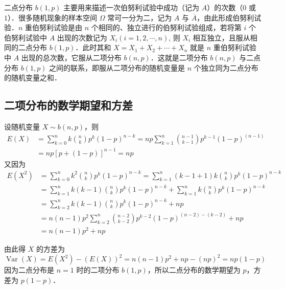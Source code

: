 二点分布 $b(1 ,p) $ 主要用来描述一次伯努利试验中成功（记为 $A$）的次数（$0$ 或 $1$）．很多随机现象的样本空间 $\Omega$ 常可一分为二，记为 $A $ 与 $\overline A$，由此形成伯努利试验．$n $ 重伯努利试验是由 $n $ 个相同的、独立进行的伯努利试验组成，若将第 $i $ 个伯努利试验中 $A $ 出现的次数记为 $X_i (i= 1,2, \cdots, n)$, 则 $X_i$ 相互独立，且服从相同的二点分布 $b(1 ,p)$．此时其和 $X=X_1+X_2+\cdots+X_n$ 就是 $n $ 重伯努利试验中 $A $ 出现的总次数，它服从二项分布 $b(n,p)$．这就是二项分布 $b (n ,p) $ 与二点分布 $b(1,p)$ 之间的联系，即服从二项分布的随机变量是 $n$ 个独立同为二点分布的随机变量之和．

\subsection{二项分布的数学期望和方差}

设随机变量 $X\sim b(n,p)$，则
\begin{equation}
\begin{aligned} E(X) &=\sum_{k=0}^{n} k\binom{n}{k} p^{k}(1-p)^{n-k}=n p \sum_{k=1}^{n}\binom{n-1}{k-1} p^{k-1}(1-p)^{(n-1)} \\ &=n p[p+(1-p)]^{n-1}=n p \end{aligned}
\end{equation}
又因为
\begin{equation}
\begin{aligned} E\left(X^{2}\right) &=\sum_{k=0}^{n} k^{2}\binom{n}{k} p^{k}(1-p)^{n-k}=\sum_{k=1}^{n}(k-1+1) k\binom{n}{k} p^{k}(1-p)^{n-k} \\ &=\sum_{k=1}^{n} k(k-1)\binom{n}{k} p^{k}(1-p)^{n-k}+\sum_{k=1}^{n} k\binom{n}{k} p^{k}(1-p)^{n-k} \\ &=\sum_{k=2}^{n} k(k-1)\binom{n}{k} p^{k}(1-p)^{n-k}+n p \\ &=n(n-1) p^{2} \sum_{k=2}^{n}\binom{n-2}{k-2} p^{k-2}(1-p)^{(n-2)-(k-2)}+n p \\ &=n(n-1) p^{2}+n p \end{aligned}
\end{equation}

由此得 $X $ 的方差为
\begin{equation}
\operatorname{Var}(X)=E\left(X^{2}\right)-(E(X))^{2}=n(n-1) p^{2}+n p-(n p)^{2}=n p(1-p)
\end{equation}
因为二点分布是 $n=1$ 时的二项分布 $b(1,p)$，所以二点分布的数学期望为 $p$，方差为 $p(1-p)$．

